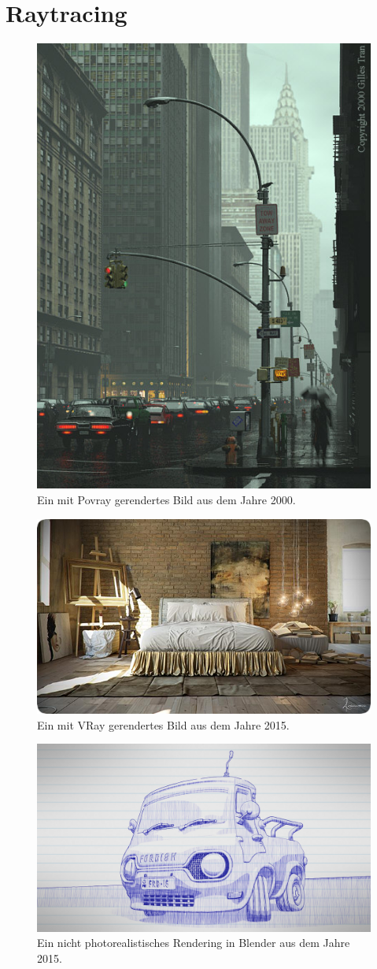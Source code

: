 \section{Raytracing}
 
\begin{figure}[H]
    \centering
    \includegraphics[height=0.7\textwidth]{images/mouille.jpg}
    \caption{Ein mit Povray gerendertes Bild aus dem Jahre 2000.}
    \label{fig:povray}
\end{figure}


 \begin{figure}[H]
    \centering
    \includegraphics[height=0.5\textwidth]{images/vray.png}
    \caption{Ein mit VRay gerendertes Bild aus dem Jahre 2015.}
    \label{fig:cray}
\end{figure}


 \begin{figure}[H]
    \centering
    \includegraphics[height=0.5\textwidth]{images/freestyle.jpg}
    \caption{Ein nicht photorealistisches Rendering in Blender aus dem Jahre 2015.}
    \label{fig:cray}
\end{figure}


